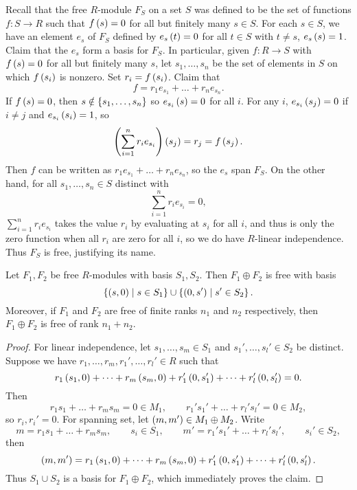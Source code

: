 Recall that the free $ R $-module $ F_S $ on a set $ S $ was defined to be the set of functions $ f : S \to R $ such that $ f\left( s \right) = 0 $ for all but finitely many $ s \in S $. For each $ s \in S $, we have an element $ e_s $ of $ F_S $ defined by $ e_s\left( t \right) = 0 $ for all $ t \in S $ with $ t \ne s $, $ e_s\left( s \right) = 1 $. Claim that the $ e_s $ form a basis for $ F_S $. In particular, given $ f : R \to S $ with $ f\left( s \right) = 0 $ for all but finitely many $ s $, let $ s_1, \dots, s_n $ be the set of elements in $ S $ on which $ f\left( s_i \right) $ is nonzero. Set $ r_i = f\left( s_i \right) $. Claim that
$$ f = r_1e_{s_1} + \dots + r_ne_{s_n}. $$
If $ f\left( s \right) = 0 $, then $ s \notin \left\{ s_1, \dots, s_n \right\} $ so $ e_{s_i}\left( s \right) = 0 $ for all $ i $. For any $ i $, $ e_{s_i}\left( s_j \right) = 0 $ if $ i \ne j $ and $ e_{s_i}\left( s_i \right) = 1 $, so
$$ \left( \sum_{i = 1}^n r_ie_{s_i} \right)\left( s_j \right) = r_j = f\left( s_j \right). $$
Then $ f $ can be written as $ r_1e_{s_1} + \dots + r_ne_{s_n} $, so the $ e_s $ span $ F_S $. On the other hand, for all $ s_1, \dots, s_n \in S $ distinct with
$$ \sum_{i = 1}^n r_ie_{s_i} = 0, $$
$ \sum_{i = 1}^n r_ie_{s_i} $ takes the value $ r_i $ by evaluating at $ s_i $ for all $ i $, and thus is only the zero function when all $ r_i $ are zero for all $ i $, so we do have $ R $-linear independence. Thus $ F_S $ is free, justifying its name.

\begin{proposition}
Let $ F_1, F_2 $ be free $ R $-modules with basis $ S_1, S_2 $. Then $ F_1 \oplus F_2 $ is free with basis
$$ \left\{ \left( s, 0 \right) \mid s \in S_1 \right\} \cup \left\{ \left( 0, s' \right) \mid s' \in S_2 \right\}. $$ Moreover, if $ F_1 $ and $ F_2 $ are free of finite ranks $ n_1 $ and $ n_2 $ respectively, then $ F_1 \oplus F_2 $ is free of rank $ n_1 + n_2 $.
\end{proposition}

\begin{proof}
For linear independence, let $ s_1, \dots, s_m \in S_1 $ and $ s_1', \dots, s_l' \in S_2 $ be distinct. Suppose we have $ r_1, \dots, r_m, r_1', \dots, r_l' \in R $ such that
$$ r_1\left( s_1, 0 \right) + \dots + r_m\left( s_m, 0 \right) + r_1'\left( 0, s_1' \right) + \dots + r_l'\left( 0, s_l' \right) = 0. $$
Then
$$ r_1s_1 + \dots + r_ms_m = 0 \in M_1, \qquad r_1's_1' + \dots + r_l's_l' = 0 \in M_2, $$
so $ r_i, r_i' = 0 $. For spanning set, let $ \left( m, m' \right) \in M_1 \oplus M_2 $. Write
$$ m = r_1s_1 + \dots + r_ms_m, \qquad s_i \in S_1, \qquad m' = r_1's_1' + \dots + r_l's_l', \qquad s_i' \in S_2, $$
then
$$ \left( m, m' \right) = r_1\left( s_1, 0 \right) + \dots + r_m\left( s_m, 0 \right) + r_1'\left( 0, s_1' \right) + \dots + r_l'\left( 0, s_l' \right). $$
Thus $ S_1 \cup S_2 $ is a basis for $ F_1 \oplus F_2 $, which immediately proves the claim.
\end{proof}


